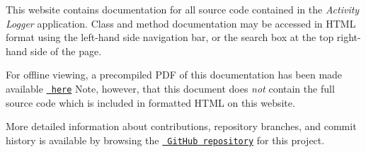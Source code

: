 This website contains documentation for all source code contained in the {\itshape Activity Logger} application. Class and method documentation may be accessed in H\+T\+ML format using the left-\/hand side navigation bar, or the search box at the top right-\/hand side of the page.

For offline viewing, a precompiled P\+DF of this documentation has been made available \href{https://jwfh.github.io/comp2005-activity-tracker/tex/manual.pdf}{\texttt{ here}} Note, however, that this document does {\itshape not} contain the full source code which is included in formatted H\+T\+ML on this website.

More detailed information about contributions, repository branches, and commit history is available by browsing the \href{https://github.com/jwfh/comp2005-activity-tracker}{\texttt{ Git\+Hub repository}} for this project. 